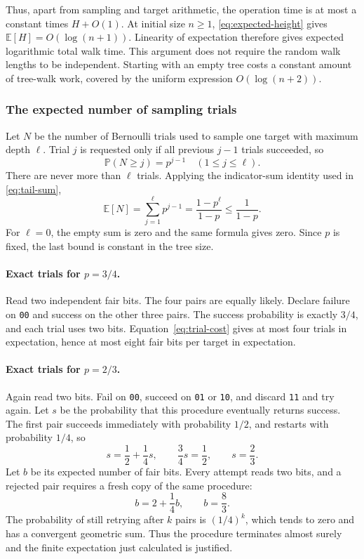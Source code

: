 \documentclass[11pt,a4paper]{article}
\theoremstyle{readable}
\newcommand{\E}{\mathbb E}
\newcommand{\Prob}{\mathbb P}
\newcommand{\code}[1]{\texttt{#1}}
\begin{document}
Thus, apart from sampling and target arithmetic, the operation time
is at most a constant times $H+O(1)$. At initial size $n\ge1$,
\eqref{eq:expected-height} gives $\E[H]=O(\log(n+1))$. Linearity
of expectation therefore gives expected logarithmic total walk time.
This argument does not require the random walk lengths to be
independent. Starting with an empty tree costs a constant amount of
tree-walk work, covered by the uniform expression $O(\log(n+2))$.

\subsubsection*{The expected number of sampling trials}
Let $N$ be the number of Bernoulli trials used to sample one target
with maximum depth $\ell$. Trial $j$ is requested only if all
previous $j-1$ trials succeeded, so
\[
  \Prob(N\ge j)=p^{j-1}\quad(1\le j\le\ell).
\]
There are never more than $\ell$ trials. Applying the indicator-sum
identity used in \eqref{eq:tail-sum},
\begin{equation}
  \E[N]=\sum_{j=1}^\ell p^{j-1}
        =\frac{1-p^\ell}{1-p}\le\frac1{1-p}.
  \label{eq:trial-cost}
\end{equation}
For $\ell=0$, the empty sum is zero and the same formula gives zero.
Since $p$ is fixed, the last bound is constant in the tree size.

\paragraph{Exact trials for $p=3/4$.}
Read two independent fair bits. The four pairs are equally likely.
Declare failure on \code{00} and success on the other three pairs.
The success probability is exactly $3/4$, and each trial uses two
bits. Equation~\eqref{eq:trial-cost} gives at most four trials in
expectation, hence at most eight fair bits per target in expectation.

\paragraph{Exact trials for $p=2/3$.}
Again read two bits. Fail on \code{00}, succeed on \code{01} or
\code{10}, and discard \code{11} and try again. Let $s$ be the
probability that this procedure eventually returns success. The first
pair succeeds immediately with probability $1/2$, and restarts with
probability $1/4$, so
\[
  s=\frac12+\frac14s,
  \qquad \frac34s=\frac12,
  \qquad s=\frac23.
\]
Let $b$ be its expected number of fair bits. Every attempt reads two
bits, and a rejected pair requires a fresh copy of the same procedure:
\[
  b=2+\frac14b,\qquad b=\frac83.
\]
The probability of still retrying after $k$ pairs is $(1/4)^k$, which
tends to zero and has a convergent geometric sum. Thus the procedure
terminates almost surely and the finite expectation just calculated
is justified.
\end{document}
